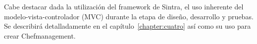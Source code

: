 Cabe destacar dada la utilización del framework de Sintra, el uso inherente del modelo-vista-controlador (MVC) durante la etapa de diseño, desarrollo y pruebas. Se describirá detalladamente en el capítulo~\ref{chapter:cuatro} así como su uso para crear Chefmanagement.

%



